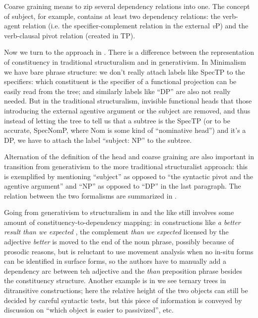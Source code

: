 \documentclass[UTF8, a4paper, oneside, scheme=plain, 12pt]{ctexbook}
\newcommand*{\citepage}[1]{p.~{#1}}
\newcommand{\form}[1]{\emph{#1}}
\newcommand{\vP}{\textit{v}P}
\begin{document}
{Coarse graining means to zip several dependency relations into one. 
The concept of subject, for example, 
contains at least two dependency relations: 
the verb-agent relation (i.e. the specifier-complement relation in the external \vP)
and the verb-clausal pivot relation (created in TP).


Now we turn to the approach in \citet{cgel}. 
There is a difference between the representation of constituency
in traditional structuralism and in generativism.
In Minimalism we have bare phrase structure: 
we don't really attach labels like SpecTP 
to the specifiers: 
which constituent is the specifier of a functional projection 
can be easily read from the tree; 
and similarly labels like ``DP'' are also not really needed.
But in the traditional structuralism, 
invisible functional heads that those introducing the external agentive argument 
or the subject are removed, 
and thus instead of letting the tree to tell us 
that a subtree is the SpecTP (or to be accurate, SpecNomP, 
where Nom is some kind of ``nominative head'') 
and it's a DP, 
we have to attach the label 
``subject: NP'' to the subtree.

Alternation of the definition of the head and coarse graining are also important 
in transition from generativism to the more traditional structuralist approach:
this is exemplified by mentioning ``subject'' 
as opposed to ``the syntactic pivot and the agentive argument''
and ``NP'' as opposed to ``DP'' in the last paragraph.
The relation between the two formalisms are summarized in .

Going from generativism to structuralism 
in \citet{cgel} and the like 
still involves some amount of constituency-to-dependency mapping: 
in constructions like \form{a better result than we expected}
\citep[\citepage{55}]{cgel},
the complement \form{than we expected} licensed by the adjective \form{better}
is moved to the end of the noun phrase, 
possibly because of prosodic reasons, 
but \citet{cgel} is reluctant to use movement analysis 
when no in-situ forms can be identified in surface forms, 
so the authors have to manually add a dependency arc 
between teh adjective and the \form{than} preposition phrase 
besides the constituency structure. 
Another example is in \citet{cgel} 
we see ternary trees in ditransitive constructions; 
here the relative height of the two objects can still be decided by 
careful syntactic tests, 
but this piece of information is conveyed by discussion on 
``which object is easier to passivized'', etc.

}
\end{document}
